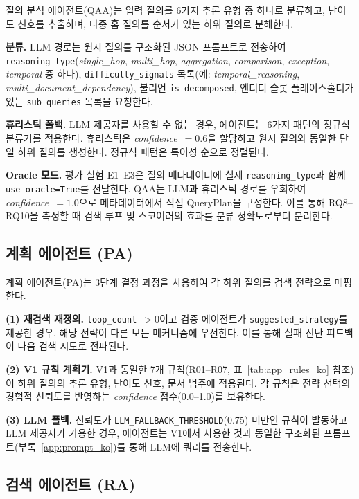 질의 분석 에이전트(QAA)는 입력 질의를 6가지 추론 유형 중 하나로 분류하고, 난이도 신호를 추출하며, 다중 홉 질의를 순서가 있는 하위 질의로 분해한다.

\textbf{분류.} LLM 경로는 원시 질의를 구조화된 JSON 프롬프트로 전송하여 \texttt{reasoning\_type}(\textit{single\_hop}, \textit{multi\_hop}, \textit{aggregation}, \textit{comparison}, \textit{exception}, \textit{temporal} 중 하나), \texttt{difficulty\_signals} 목록(예: \textit{temporal\_reasoning}, \textit{multi\_document\_dependency}), 불리언 \texttt{is\_decomposed}, 엔티티 슬롯 플레이스홀더가 있는 \texttt{sub\_queries} 목록을 요청한다.

\textbf{휴리스틱 폴백.} LLM 제공자를 사용할 수 없는 경우, 에이전트는 6가지 패턴의 정규식 분류기를 적용한다. 휴리스틱은 \textit{confidence}~$= 0.6$을 할당하고 원시 질의와 동일한 단일 하위 질의를 생성한다. 정규식 패턴은 특이성 순으로 정렬된다.

\textbf{Oracle 모드.} 평가 실험 E1--E3은 질의 메타데이터에 실제 \texttt{reasoning\_type}과 함께 \texttt{use\_oracle=True}를 전달한다. QAA는 LLM과 휴리스틱 경로를 우회하여 \textit{confidence}~$= 1.0$으로 메타데이터에서 직접 QueryPlan을 구성한다. 이를 통해 RQ8--RQ10을 측정할 때 검색 루프 및 스코어러의 효과를 분류 정확도로부터 분리한다.

\subsection{계획 에이전트 (PA)}
\label{subsec:v2_plan_ko}

계획 에이전트(PA)는 3단계 결정 과정을 사용하여 각 하위 질의를 검색 전략으로 매핑한다.

\textbf{(1) 재검색 재정의.} \texttt{loop\_count}~$> 0$이고 검증 에이전트가 \texttt{suggested\_strategy}를 제공한 경우, 해당 전략이 다른 모든 메커니즘에 우선한다. 이를 통해 실패 진단 피드백이 다음 검색 시도로 전파된다.

\textbf{(2) V1 규칙 계획기.} V1과 동일한 7개 규칙(R01--R07, 표~\ref{tab:app_rules_ko} 참조)이 하위 질의의 추론 유형, 난이도 신호, 문서 범주에 적용된다. 각 규칙은 전략 선택의 경험적 신뢰도를 반영하는 \textit{confidence} 점수(0.0--1.0)를 보유한다.

\textbf{(3) LLM 폴백.} 신뢰도가 \texttt{LLM\_FALLBACK\_THRESHOLD}(0.75) 미만인 규칙이 발동하고 LLM 제공자가 가용한 경우, 에이전트는 V1에서 사용한 것과 동일한 구조화된 프롬프트(부록~\ref{app:prompt_ko})를 통해 LLM에 쿼리를 전송한다.

\subsection{검색 에이전트 (RA)}
\label{subsec:v2_retrieval_ko}

